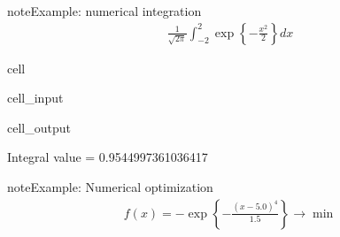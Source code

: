 \documentclass[letterpaper,10pt,english]{jupyterBook}
\begin{document}
\begin{sphinxadmonition}{note}{Example: numerical integration}
\begin{equation*}
\begin{split}
\frac{1}{\sqrt{2\pi}} 
\int_{-2}^2 
\exp\left\{ - \frac{x^2}{2} \right\} dx
\end{split}
\end{equation*}\end{sphinxadmonition}

\begin{sphinxuseclass}{cell}\begin{sphinxVerbatimInput}

\begin{sphinxuseclass}{cell_input}
\begin{sphinxVerbatim}[commandchars=\\\{\}]
   
   
  
     
\end{sphinxVerbatim}

\end{sphinxuseclass}\end{sphinxVerbatimInput}
\begin{sphinxVerbatimOutput}

\begin{sphinxuseclass}{cell_output}
\begin{sphinxVerbatim}[commandchars=\\\{\}]
Integral value = 0.9544997361036417
\end{sphinxVerbatim}

\end{sphinxuseclass}\end{sphinxVerbatimOutput}

\end{sphinxuseclass}
\begin{sphinxadmonition}{note}{Example: Numerical optimization}
\begin{equation*}
\begin{split}
f(x) = - \exp
\left\{-\frac{(x - 5.0)^4}{1.5} \right\}
\rightarrow \min
\end{split}
\end{equation*}\end{sphinxadmonition}
\end{document}
